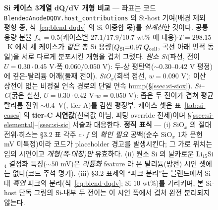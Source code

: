 \begin{figure}[t]
\caption{\textbf{Si 케이스 3계열 dQ/dV 개형 비교} --- 좌표는 코드
\texttt{BlendedAnodeDQDV.host\_contributions} 의 Si-host 기여(배경 제외 평형 종, 식~\eqref{eq:blend-dqdv}
의 Si 이중합 몫)를 \emph{실계산}한 것이다. 공통 용량 분율 $f_\mathrm{Si}{=}0.5$(케이스별 $27.1/17.9/10.7$
wt\% 에 대응)$\cdot$$T{=}298.15$~K 에서 세 케이스가 \emph{같은} 총 Si 용량($Q_\mathrm{Si}{=}0.97\,Q_{\mathrm{cell}}$,
곡선 아래 면적 동일)을 서로 다르게 분포시킨 개형을 겹쳐 그렸다. \emph{원소 Si}(파선, 전이 $U{=}0.30\cdot0.45$
V$\cdot$폭 $0.060/0.050$ V): 두-상 평탄역($\sim$$0.30$--$0.42$ V 평정)에 깊은-탈리튬 어깨(둘째 전이). \emph{SiO$_x$}(회색
점선, $w{=}0.090$ V): 이산 상전이 없는 비정질 연속 경로의 단일 연속 hump(\S\ref{ssec:si-siox}). \emph{Si--C}(굵은
실선, $U{=}0.30\cdot0.42$ V$\cdot$$w{=}0.050$ V): 좁은 두 전이가 겹쳐 평균 탈리튬 전위 $\sim$$0.4$~V(\cite{andersen_sic2019},
tier-A)를 감싼 평정부. 케이스 셋은 표~\ref{tab:si-cases} 의 \textbf{tier-C 시연값}(신뢰값 아님, 피팅 override
전제)이며 \S\ref{ssec:si-elemental}--\ref{ssec:si-sic} 서술과 대응한다. \textbf{정직 표식} --- (i) SiO$_x$ 의
절대 전위$\cdot$히스는 §3.2 표 각주 $c\cdot f$ 의 \emph{확인 필요} 공백(순수 SiO$_x$ 1차 문헌 mV 미특정)이라 코드가
placeholder 경고를 발생시킨다; 그 가로 위치는 임의 시연이고 \emph{개형(폭$\cdot$대칭)만} 유효하다. (ii) 원소 Si 의
날카로운 Li$_{15}$Si$_4$ 결정화 특징($\sim$$50$ mV)은 \emph{리튬화} feature 라 본 탈리튬(방전) 시연 셋에는 없다(코드
주석 명기). (iii) §3.2 표제의 ``피크 분리''는 블렌드에서 Si 대 \emph{흑연} 피크의 분리(식~\eqref{eq:blend-dqdv};
Si $10$ wt\%\cite{naboka_sic2021})를 가리키며, 본 Si-host 단독 그림의 Si-내부 두 전이는 이 시연 폭에서 겹쳐 완전
분리되지 않는다.}
\label{fig:si-cases-shape}
\end{figure}
